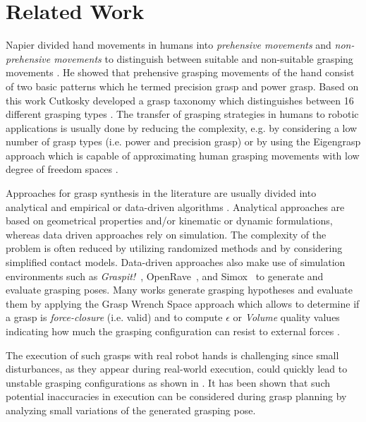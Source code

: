\section{Related Work}
\label{sec-realted-work}

Napier divided hand movements in humans into \textit{prehensive movements} and \textit{non-prehensive movements} to distinguish between suitable and non-suitable grasping movements \cite{napier1956prehensile}. 
He showed that prehensive grasping movements of the hand consist of two basic patterns which he termed precision grasp and power grasp. 
Based on this work Cutkosky developed a grasp taxonomy which distinguishes between 16 different grasping types \cite{cutkosky1989}. 
The transfer of grasping strategies in humans to robotic applications is usually done by reducing the complexity, e.g. by considering a low number of grasp types (i.e. power and precision grasp) or by using the Eigengrasp approach which is capable of approximating human grasping movements with low degree of freedom spaces \cite{CiocarlieA09}.

Approaches for grasp synthesis in the literature are usually divided into analytical and empirical or data-driven algorithms \cite{bohg2014, sahbani2012overview}.
Analytical approaches are based on geometrical properties and/or kinematic or dynamic formulations, whereas data driven approaches rely on simulation. The complexity of the problem is often reduced by utilizing randomized methods and by considering simplified contact models.
Data-driven approaches also make use of simulation environments such as \textit{Graspit!}~\cite{Miller2004}, OpenRave~\cite{Diankov2010}, and Simox~\cite{Vahrenkamp12b} to generate and evaluate grasping poses. Many works generate grasping hypotheses and evaluate them by applying the Grasp Wrench Space approach which allows to determine if a grasp is \textit{force-closure} (i.e. valid) and to compute $\epsilon$ or \textit{Volume} quality values indicating how much the grasping configuration can resist to external forces \cite{ferrari1992planning, Roa2015}.

The execution of such grasps with real robot hands is challenging since small disturbances, as they appear during real-world execution, could quickly lead to unstable grasping configurations as shown in \cite{weisz2012pose}. It has been shown that such potential inaccuracies in execution can be considered during grasp planning by analyzing small variations of the generated grasping pose.

